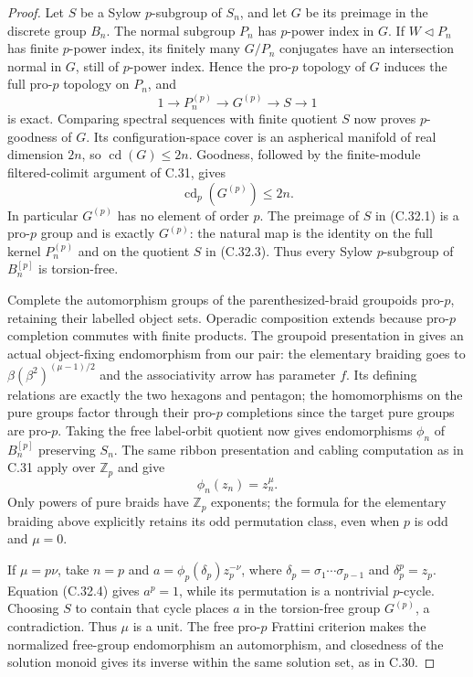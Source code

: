 \documentclass[11pt]{article}
\begin{document}
\begin{proof}
Let $S$ be a Sylow $p$-subgroup of $S_n$, and let $G$ be its
preimage in the discrete group $B_n$. The normal subgroup $P_n$
has $p$-power index in $G$. If $W\triangleleft P_n$ has finite
$p$-power index, its finitely many $G/P_n$ conjugates have an
intersection normal in $G$, still of $p$-power index. Hence the
pro-$p$ topology of $G$ induces the full pro-$p$ topology on $P_n$,
and
\[
 1\longrightarrow P_n^{(p)}\longrightarrow G^{(p)}
       \longrightarrow S\longrightarrow1                       \tag{C.32.3}
\]
is exact. Comparing spectral sequences with finite quotient $S$
now proves $p$-goodness of $G$. Its configuration-space cover is
an aspherical manifold of real dimension $2n$, so
$\operatorname{cd}(G)\leq2n$. Goodness, followed by the finite-module
filtered-colimit argument of C.31, gives
\[
                    \operatorname{cd}_p(G^{(p)})\leq2n.
\]
In particular $G^{(p)}$ has no element of order $p$. The preimage
of $S$ in (C.32.1) is a pro-$p$ group and is exactly $G^{(p)}$:
the natural map is the identity on the full kernel $P_n^{(p)}$
and on the quotient $S$ in (C.32.3). Thus every Sylow $p$-subgroup
of $B_n^{[p]}$ is torsion-free.

Complete the automorphism groups of the parenthesized-braid
groupoids pro-$p$, retaining their labelled object sets. Operadic
composition extends because pro-$p$ completion commutes with finite
products. The groupoid presentation in
\cite[Lemma 7.1 and Proposition 7.3]{CEBHR2019} gives an actual
object-fixing endomorphism from our pair: the elementary braiding
goes to $\beta(\beta^2)^{(\mu-1)/2}$ and the associativity arrow
has parameter $f$. Its defining relations are exactly the two
hexagons and pentagon; the homomorphisms on the pure groups factor
through their pro-$p$ completions since the target pure groups
are pro-$p$. Taking the free label-orbit quotient now gives
endomorphisms $\phi_n$ of $B_n^{[p]}$ preserving $S_n$.
The same ribbon presentation and cabling computation as in C.31
apply over $\mathbb Z_p$ and give
\[
                             \phi_n(z_n)=z_n^\mu.                \tag{C.32.4}
\]
Only powers of pure braids have $\mathbb Z_p$ exponents; the formula
for the elementary braiding above explicitly retains its odd
permutation class, even when $p$ is odd and $\mu=0$.

If $\mu=p\nu$, take $n=p$ and
$a=\phi_p(\delta_p)z_p^{-\nu}$, where
$\delta_p=\sigma_1\cdots\sigma_{p-1}$ and $\delta_p^p=z_p$.
Equation (C.32.4) gives $a^p=1$, while its permutation is a
nontrivial $p$-cycle. Choosing $S$ to contain that cycle places
$a$ in the torsion-free group $G^{(p)}$, a contradiction.
Thus $\mu$ is a unit. The free pro-$p$ Frattini criterion makes
the normalized free-group endomorphism an automorphism, and
closedness of the solution monoid gives its inverse within the
same solution set, as in C.30.
\end{proof}
\end{document}
